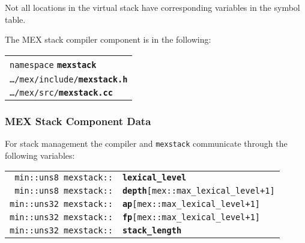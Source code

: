 \documentclass[12pt]{article}
\makeatletter
\newcommand{\TT}[1]{{\tt \bfseries #1}}
\newcommand{\ttkey}[1]{\TT{#1}\index{#1@{\tt #1}}}
\newcommand{\ttindex}[1]{\index{#1@{\tt #1}}}
\newenvironment{indpar}[1][0.3in]%
	{\begin{list}{}%
		     {\setlength{\itemsep}{0in}%
		      \setlength{\topsep}{0in}%
		      \setlength{\parsep}{1ex}%
		      \setlength{\labelwidth}{#1}%
		      \setlength{\leftmargin}{#1}%
		      \addtolength{\leftmargin}{\labelsep}}%
	 \item}%
	{\end{list}}
\newcommand{\MEXSTACKKEY}[1]%
	   {\TT{#1}\ttindex{mexstack::#1}\ttindex{#1}}
\makeatother
\begin{document}
Not all locations in the virtual stack have corresponding variables
in the symbol table.

The MEX stack compiler component is in the following:

\begin{indpar}
\begin{tabular}{l}
{\tt namespace} \ttkey{mexstack}
\\
{\tt \ldots/mex/include/}\ttkey{mexstack.h}
\\
{\tt \ldots/mex/src/}\ttkey{mexstack.cc}
\end{tabular}
\end{indpar}

\subsubsection{MEX Stack Component Data}
\label{MEX-STACK-COMPONENT-DATA}

For stack management the compiler and {\tt mexstack}
communicate through the following variables:

\begin{tabular}{@{}r@{~~~}l}
\verb|min::uns8 mexstack::| & \MEXSTACKKEY{lexical\_level} \\
\verb|min::uns8 mexstack::| &
    \MEXSTACKKEY{depth}\verb|[mex::max_lexical_level+1]| \\
\verb|min::uns32 mexstack::| &
    \MEXSTACKKEY{ap}\verb|[mex::max_lexical_level+1]| \\
\verb|min::uns32 mexstack::| &
    \MEXSTACKKEY{fp}\verb|[mex::max_lexical_level+1]| \\
\verb|min::uns32 mexstack::| & \MEXSTACKKEY{stack\_length} \\
\end{tabular}
\end{document}
